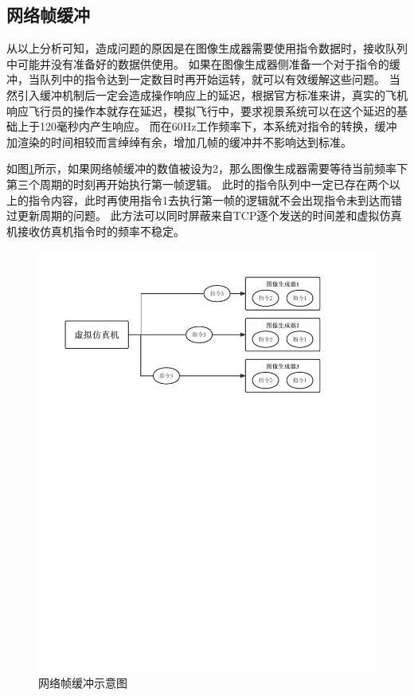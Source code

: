 \subsection{网络帧缓冲}
从以上分析可知，造成问题的原因是在图像生成器需要使用指令数据时，接收队列中可能并没有准备好的数据供使用。
如果在图像生成器侧准备一个对于指令的缓冲，当队列中的指令达到一定数目时再开始运转，就可以有效缓解这些问题。
当然引入缓冲机制后一定会造成操作响应上的延迟，根据官方标准来讲，真实的飞机响应飞行员的操作本就存在延迟，模拟飞行中，要求视景系统可以在这个延迟的基础上于120毫秒内产生响应。
而在60Hz工作频率下，本系统对指令的转换，缓冲加渲染的时间相较而言绰绰有余，增加几帧的缓冲并不影响达到标准。
\clearpage
\par
如图\ref{framebuffer}所示，如果网络帧缓冲的数值被设为2，那么图像生成器需要等待当前频率下第三个周期的时刻再开始执行第一帧逻辑。
此时的指令队列中一定已存在两个以上的指令内容，此时再使用指令1去执行第一帧的逻辑就不会出现指令未到达而错过更新周期的问题。
此方法可以同时屏蔽来自TCP逐个发送的时间差和虚拟仿真机接收仿真机指令时的频率不稳定。
\begin{figure}[h!]
    \begin{center}
        \includegraphics[width=\textwidth]{pictures/framebuffer.pdf}
        \caption{网络帧缓冲示意图}
        \label{framebuffer}
    \end{center}
\end{figure}
